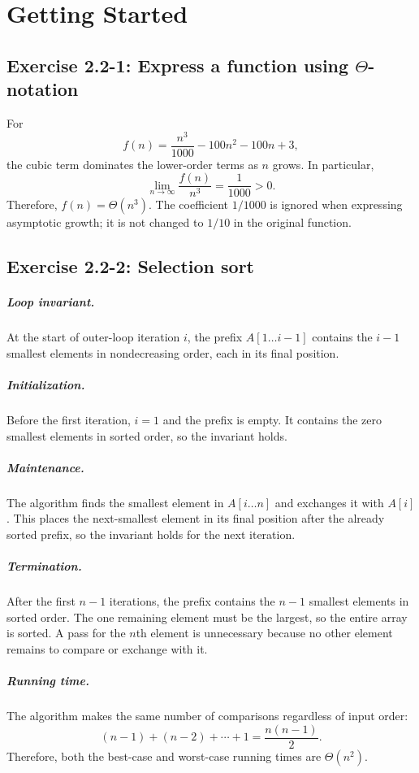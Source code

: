 \chapter{Getting Started}

\section{Exercise 2.2-1: Express a function using $\Theta$-notation}

For
\begin{equation*}
    f(n) = \frac{n^3}{1000} - 100n^2 - 100n + 3,
\end{equation*}
the cubic term dominates the lower-order terms as $n$ grows. In particular,
\begin{equation*}
    \lim_{n \to \infty} \frac{f(n)}{n^3} = \frac{1}{1000} > 0.
\end{equation*}
Therefore, $f(n) = \Theta(n^3)$. The coefficient $1/1000$ is ignored when
expressing asymptotic growth; it is not changed to $1/10$ in the original
function.

\section{Exercise 2.2-2: Selection sort}

\paragraph{Loop invariant.}
At the start of outer-loop iteration $i$, the prefix $A[1 \ldots i-1]$
contains the $i-1$ smallest elements in nondecreasing order, each in its final
position.

\paragraph{Initialization.}
Before the first iteration, $i=1$ and the prefix is empty. It contains the
zero smallest elements in sorted order, so the invariant holds.

\paragraph{Maintenance.}
The algorithm finds the smallest element in $A[i \ldots n]$ and exchanges it
with $A[i]$. This places the next-smallest element in its final position after
the already sorted prefix, so the invariant holds for the next iteration.

\paragraph{Termination.}
After the first $n-1$ iterations, the prefix contains the $n-1$ smallest
elements in sorted order. The one remaining element must be the largest, so the
entire array is sorted. A pass for the $n$th element is unnecessary because no
other element remains to compare or exchange with it.

\paragraph{Running time.}
The algorithm makes the same number of comparisons regardless of input order:
\begin{equation*}
    (n-1) + (n-2) + \cdots + 1 = \frac{n(n-1)}{2}.
\end{equation*}
Therefore, both the best-case and worst-case running times are
$\Theta(n^2)$.
